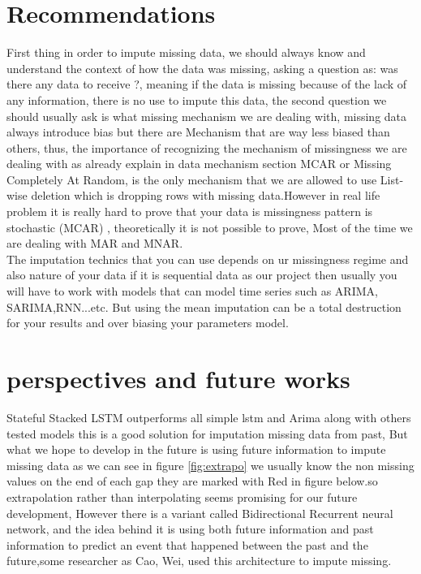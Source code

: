 \section{Recommendations}
First thing in order to impute missing data, we should always know and understand the context of how the data was missing, asking a question as:  was there any data to receive ?, meaning if the data is missing because of the lack of any information, there is no use to impute this data, the second question we should usually ask is what missing mechanism we are dealing with, missing data always introduce bias but there are Mechanism that are way less biased than others, thus, the importance of recognizing the mechanism of missingness we are dealing with as already explain in data mechanism section MCAR or Missing Completely At Random, is the only mechanism that we are allowed to  use List-wise deletion which is dropping rows with missing data.However in real life problem it is really hard to prove that your data is missingness pattern is stochastic (MCAR) , theoretically it is not possible to prove, Most of the time we are dealing with MAR and MNAR.\\The imputation technics that you can use depends on ur missingness regime and also nature of your data if it is sequential data as our project then usually you will have to work with models that can model time series such as ARIMA, SARIMA,RNN...etc. But using the mean imputation can be a total destruction for your results and over biasing your parameters model.

\section{perspectives and future works }

Stateful Stacked LSTM outperforms all simple lstm and Arima along with others tested models this is a good solution for imputation missing data from past, But what we hope to develop in the future is using future information to impute missing data as we can see in figure \ref{fig:extrapo}  we usually know the non missing values on the end of each gap they are marked with Red in figure below.so extrapolation rather than interpolating seems promising for our future development, However there is a variant called Bidirectional Recurrent neural network, and the idea behind it is using both future information and past information  to predict an event that happened between the past and the future,some researcher as Cao, Wei, \cite{brits} used this architecture to impute missing. 

